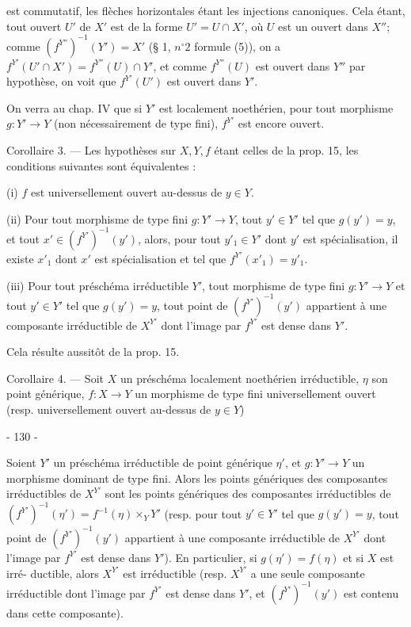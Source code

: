 \newpage



est commutatif, les flèches horizontales étant les injections canoniques. Cela étant, tout ouvert $U'$ de $X'$ est de la forme $U' = U \cap X'$, où $U$ est un ouvert dans $X''$; comme $(f^{Y''})^{-1}(Y') = X'$ (§ 1, $n^\circ 2$ formule (5)), on a $f^{Y'}(U' \cap X') = f^{Y''}(U) \cap Y'$, et comme $f^{Y''}(U)$ est ouvert dans $Y''$ par hypothèse, on voit que $f^{Y'}(U')$ est ouvert dans $Y'$.

On verra au chap. IV que si $Y'$ est localement noethérien, pour tout morphisme $g: Y' \to Y$ (non nécessairement de type fini), $f^{Y'}$ est encore ouvert.

Corollaire 3. — Les hypothèses sur $X, Y, f$ étant celles de la prop. 15, les conditions suivantes sont équivalentes :

(i) $f$ est universellement ouvert au-dessus de $y \in Y$.

(ii) Pour tout morphisme de type fini $g: Y' \to Y$, tout $y' \in Y'$ tel que $g(y') = y$, et tout $x' \in (f^{Y'})^{-1}(y')$, alors, pour tout $y'_1 \in Y'$ dont $y'$ est spécialisation, il existe $x'_1$ dont $x'$ est spécialisation et tel que $f^{Y'}(x'_1) = y'_1$.

(iii) Pour tout préschéma irréductible $Y'$, tout morphisme de type fini $g: Y' \to Y$ et tout $y' \in Y'$ tel que $g(y') = y$, tout point de $(f^{Y'})^{-1}(y')$ appartient à une composante irréductible de $X^{Y'}$ dont l'image par $f^{Y'}$ est dense dans $Y'$.

Cela résulte aussitôt de la prop. 15.

Corollaire 4. — Soit $X$ un préschéma localement noethérien irréductible, $\eta$ son point générique, $f: X \to Y$ un morphisme de type fini universellement ouvert (resp. universellement ouvert au-dessus de $y \in Y$)

\newpage


- 130 -

Soient $Y'$ un préschéma irréductible de point générique $\eta'$, et
$g : Y' \to Y$ un morphisme dominant de type fini. Alors les points génériques
des composantes irréductibles de $X^{Y'}$ sont les points génériques
des composantes irréductibles de $(f^{Y'})^{-1}(\eta') = f^{-1}(\eta) \times_Y Y'$
(resp. pour tout $y' \in Y'$ tel que $g(y') = y$, tout point de $(f^{Y'})^{-1}(y')$
appartient à une composante irréductible de $X^{Y'}$ dont l'image par $f^{Y'}$
est dense dans $Y'$). En particulier, si $g(\eta') = f(\eta)$ et si $X$ est irré-
ductible, alors $X^{Y'}$ est irréductible (resp. $X^{Y'}$ a une seule composante
irréductible dont l'image par $f^{Y'}$ est dense dans $Y'$, et
$(f^{Y'})^{-1}(y')$ est contenu dans cette composante).

